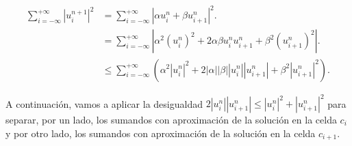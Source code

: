 \begin{frame}
    \frametitle{\secname}

    \begin{proofs}
        \begin{align*}
            \sum_{i=-\infty}^{+\infty}
            {\left|u^{n+1}_{i}\right|}^{2} & =
            \sum_{i=-\infty}^{+\infty}
            {
            \left|\alpha u^{n}_{i}+
            \beta u^{n}_{i+1}\right|
            }^{2}.                                \\
                                           & =
            \sum_{i=-\infty}^{+\infty}
            \left|
            \alpha^{2}
            {\left(u^{n}_{i}\right)}^{2}+
            2\alpha\beta
            u^{n}_{i}
            u^{n}_{i+1}+
            \beta^{2}
            {\left(u^{n}_{i+1}\right)}^{2}
            \right|.                              \\
                                           & \leq
            \sum_{i=-\infty}^{+\infty}
            \left(
            \alpha^{2}
            {\left|u^{n}_{i}\right|}^{2}+
            2\left|\alpha\right|
            \left|\beta\right|
            \left|u^{n}_{i}\right|
            \left|u^{n}_{i+1}\right|+
            \beta^{2}
            {\left|u^{n}_{i+1}\right|}^{2}
            \right).
        \end{align*}

        A continuación, vamos a aplicar la desigualdad
        \begin{math}
            2
            \left|u^{n}_{i}\right|
            \left|u^{n}_{i+1}\right|\leq
            {\left|u^{n}_{i}\right|}^{2}+
            {\left|u^{n}_{i+1}\right|}^{2}
        \end{math}
        para separar, por un lado, los sumandos con aproximación de la
        solución en la celda $c_{i}$ y por otro lado, los sumandos con
        aproximación de la solución en la celda $c_{i+1}$.
    \end{proofs}
\end{frame}

